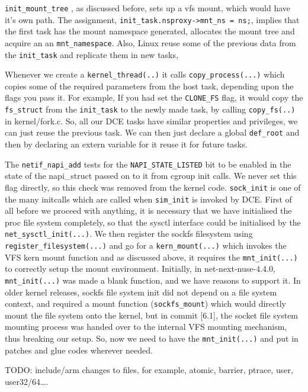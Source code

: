 \documentclass{sig-alternate}
\begin{document}
\texttt{init\_mount\_tree} , as discussed before, sets up a vfs mount, which would have it's own path. The assignment, 
\texttt{init\_task.nsproxy->mnt\_ns = ns;}, implies that the first task has the mount namespace generated, allocates the mount tree and 
acquire an an \texttt{mnt\_namespace}. Also, Linux reuse some of the previous data from the \texttt{init\_task} and replicate them in new tasks,

Whenever we create a \texttt{kernel\_thread(..)} it calls \texttt{copy\_process(...)} which copies some of the required parameters from the host task, 
depending upon the flags you pass 
it. For example, If you had set the \texttt{CLONE\_FS} flag, it would copy the \texttt{fs\_struct} from the \texttt{init\_task} to the newly made task, 
by calling \texttt{copy\_fs(..)}
in kernel/fork.c. So, all our DCE tasks have similar properties and privileges, we can just reuse the previous task. 
We can then just declare a global \texttt{def\_root} and then by declaring an extern variable for it reuse it for future tasks.

The \texttt{netif\_napi\_add} tests for the \texttt{NAPI\_STATE\_LISTED} bit to be enabled in the state of the napi\_struct passed on to it from cgroup init calls. 
We never set this flag directly, so this check was removed from the kernel code. \texttt{sock\_init} is one of the many initcalls which are called when 
\texttt{sim\_init} is invoked by DCE. First of all before we proceed with anything, it is necessary that we have initialised the proc file system completely,
so that the sysctl interface could be initialised by the \texttt{net\_sysctl\_init(...)}. We then register the sockfs filesystem using \texttt{register\_filesystem(...)} 
and go for a \texttt{kern\_mount(...)} which invokes the VFS kern mount function and as discussed above, it requires the \texttt{mnt\_init(...)} to correctly setup 
the mount environment. Initially, in net-next-nuse-4.4.0, \texttt{mnt\_init(...)}  was made a blank function, and we have reasons to support it. 
In older kernel releases, sockfs file system init did not depend on a file system context, and required a mount function (\texttt{sockfs\_mount}) which
would directly mount the file system onto the kernel, but in commit [6.1], the socket file system mounting process was handed over to the
internal VFS mounting mechanism, thus breaking our setup. So, now we need to have the \texttt{mnt\_init(...)} and put in patches and glue codes wherever
needed.

TODO: include/arm changes to files, for example, atomic, barrier, ptrace, user, user32/64….
\end{document}
